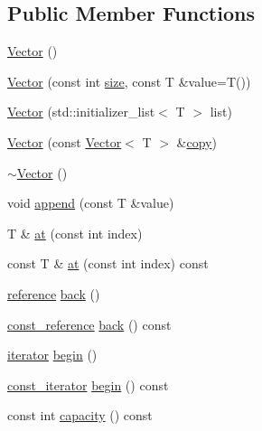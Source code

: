 \subsection*{Public Member Functions}
\begin{DoxyCompactItemize}
\item 
\hyperlink{classprism_1_1_vector_a0081b629c0ab4d85d6847a8cf382f1af}{Vector} ()
\item 
\hyperlink{classprism_1_1_vector_a61d37ac01e42fca59cdf320804a2a7ed}{Vector} (const int \hyperlink{classprism_1_1_vector_ac6ff3296683e76da61d48bcc15e4f175}{size}, const T \&value=T())
\item 
\hyperlink{classprism_1_1_vector_a9a0d26456174aafd6bdae178f68dcd6d}{Vector} (std\+::initializer\+\_\+list$<$ T $>$ list)
\item 
\hyperlink{classprism_1_1_vector_a6df8c0a101ff496b688f4937ec1f13e6}{Vector} (const \hyperlink{classprism_1_1_vector}{Vector}$<$ T $>$ \&\hyperlink{namespaceprism_ae776f4cd825f79e7af1cf6ee1d90a209}{copy})
\item 
\hyperlink{classprism_1_1_vector_a80f2790bb6011dd40739bff844fd3154}{$\sim$\+Vector} ()
\item 
void \hyperlink{classprism_1_1_vector_a690b3be3b217aab2842a5b9b7b0ab4dd}{append} (const T \&value)
\item 
T \& \hyperlink{classprism_1_1_vector_ad47f765360ae83602b645afe23a65541}{at} (const int index)
\item 
const T \& \hyperlink{classprism_1_1_vector_accf072a45a5be33b09d3210df16f52d5}{at} (const int index) const 
\item 
\hyperlink{classprism_1_1_vector_a8ccf98342707efbed82918a44be97438}{reference} \hyperlink{classprism_1_1_vector_a1e19cfd05c60f96f31fb4feba79fe4eb}{back} ()
\item 
\hyperlink{classprism_1_1_vector_a75325487acaa0f63496c110e5a5632bb}{const\+\_\+reference} \hyperlink{classprism_1_1_vector_abae5f68837ada40afa65d7ff492cc79f}{back} () const 
\item 
\hyperlink{classprism_1_1_vector_aa547779173a63f6f8c9b2887498d10eb}{iterator} \hyperlink{classprism_1_1_vector_a4e1871436d85d42653eddf9cf0dac271}{begin} ()
\item 
\hyperlink{classprism_1_1_vector_acc6ed07e2d7ed5065feec92a83e46fa4}{const\+\_\+iterator} \hyperlink{classprism_1_1_vector_a4cd1ca2ba159fd073127be98b37f6ba2}{begin} () const 
\item 
const int \hyperlink{classprism_1_1_vector_aa6bfbb4672a51177c6fafbd503e90a92}{capacity} () const 

\end{DoxyCompactItemize}
